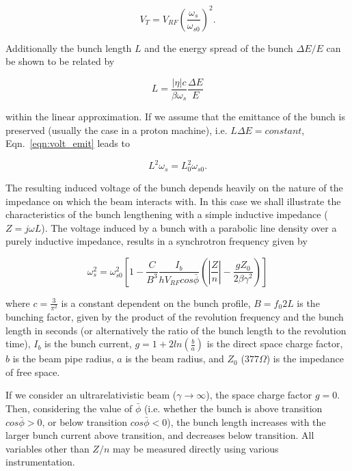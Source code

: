 \begin{equation}
V_{T} = V_{RF}\left(  \frac{\omega_{s}}{\omega_{s0}} \right)^{2}.
\label{eqn:volt_emit}
\end{equation}

Additionally the bunch length $L$ and the energy spread of the bunch $\Delta E/E$ can be shown to be related by

\begin{equation}
L = \frac{\left| \eta \right|c}{\beta\omega_{s}}\frac{\Delta E}{E}
\end{equation}

within the linear approximation. If we assume that the emittance of the bunch is preserved (usually the case in a proton machine), i.e. $L\Delta E = constant$, Eqn.~\ref{eqn:volt_emit} leads to

\begin{equation}
L^{2}\omega_{s} = L_{0}^{2}\omega_{s0}.
\end{equation}

The resulting induced voltage of the bunch depends heavily on the nature of the impedance on which the beam interacts with. In this case we shall illustrate the characteristics of the bunch lengthening with a simple inductive impedance ($Z = j\omega L$). The voltage induced by a bunch with a parabolic line density over a purely inductive impedance, results in a synchrotron frequency given by

\begin{equation}
\omega_{s}^{2} = \omega_{s0}^{2}\left[ 1 - \frac{C}{B^{3}} \frac{I_{b}}{hV_{RF}cos\bar{\phi}} \left( \left| \frac{Z}{n}  \right| - \frac{gZ_{0}}{2\beta\gamma^{2}}   \right)    \right]
\end{equation}

where $c = \frac{3}{\pi^{2}}$ is a constant dependent on the bunch profile, $B = f_{0}2L$ is the bunching
factor, given by the product of the revolution frequency and the bunch length in seconds (or alternatively the ratio of the bunch length to the revolution time), $I_{b}$ is the bunch current, $g = 1 + 2ln\left(\frac{b}{a} \right)$ is the direct space charge factor, $b$ is the beam pipe radius, $a$ is the beam radius, and $Z_{0}$ ($377\Omega$) is the impedance of free space.

If we consider an ultrarelativistic beam ($\gamma \rightarrow \infty$), the space charge factor $g = 0$. Then, considering the value of $\bar{\phi}$ (i.e. whether the bunch is above transition $cos\bar{\phi} > 0$, or below transition $cos\bar{\phi} < 0$), the bunch length increases with the larger bunch current above transition, and decreases below transition. All variables other than $Z/n$ may be measured directly using various instrumentation.


